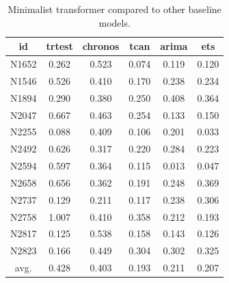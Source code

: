 \documentclass[algorithms,article,submit,pdftex,moreauthors]{Definitions/mdpi}
\begin{document}
\begin{table}[H]
	\caption{Minimalist transformer compared to other baseline models.}
	\label{tab:comparisons}
	\centering
	\begin{tabular}{c|ccccc}
		\toprule
		id   & trtest & chronos & tcan & arima & ets \\
		\midrule
		N1652 & 0.262 & 0.523 & 0.074 & 0.119 & 0.120 \\
		N1546 & 0.526 & 0.410 & 0.170 & 0.238 & 0.234 \\
		N1894 & 0.290 & 0.380 & 0.250 & 0.408 & 0.364 \\
		N2047 & 0.667 & 0.463 & 0.254 & 0.133 & 0.150 \\
		N2255 & 0.088 & 0.409 & 0.106 & 0.201 & 0.033 \\
		N2492 & 0.626 & 0.317 & 0.220 & 0.284 & 0.223 \\
		N2594 & 0.597 & 0.364 & 0.115 & 0.013 & 0.047 \\
		N2658 & 0.656 & 0.362 & 0.191 & 0.248 & 0.369 \\
		N2737 & 0.129 & 0.211 & 0.117 & 0.238 & 0.306 \\
		N2758 & 1.007 & 0.410 & 0.358 & 0.212 & 0.193 \\
		N2817 & 0.125 & 0.538 & 0.158 & 0.143 & 0.126 \\
		N2823 & 0.166 & 0.449 & 0.304 & 0.302 & 0.325 \\
		avg.	& 0.428 & 0.403 & 0.193 & 0.211 & 0.207 \\
		\bottomrule
	\end{tabular}
\end{table}
\end{document}
